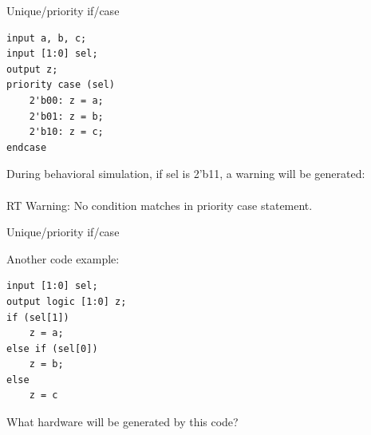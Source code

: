 \documentclass[table,dvipsnames]{beamer}
\begin{document}
 
  \begin{frame}[fragile]{Unique/priority if/case}
	\begin{verbatim}
input a, b, c;
input [1:0] sel;
output z;
priority case (sel)
	2'b00: z = a;
	2'b01: z = b;
	2'b10: z = c;
endcase
	\end{verbatim}
	\begin{block}{}
		During behavioral simulation, if sel is 2'b11, a warning will be generated:
		\\\\\color{red} RT Warning: No condition matches in priority case statement.
	\end{block}

\end{frame}
 
 
  \begin{frame}[fragile]{Unique/priority if/case}
  \begin{block}{Another code example:}
	\begin{verbatim}
input [1:0] sel;
output logic [1:0] z;
if (sel[1])
	z = a;
else if (sel[0])
	z = b;
else
	z = c	
	\end{verbatim}
	\end{block}
	\begin{block}{What hardware will be generated by this code?}
	\end{block}

\end{frame}
 
 
 
\end{document}
